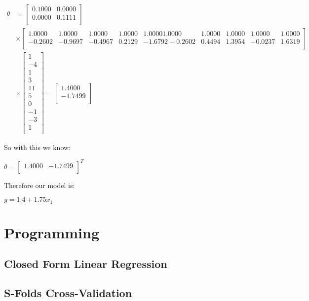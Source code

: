 \documentclass[12pt]{article}
\begin{document}
\begin{center}
\begin{align*}
        \theta &=
        \begin{bmatrix}
            0.1000 &  0.0000\\
            0.0000  &  0.1111\\
        \end{bmatrix} 
        \\
        &\times
        \begin{bmatrix}
            1.0000  &  1.0000 &   1.0000   & 1.0000  &  1.0000    1.0000  &  1.0000 &   1.0000   & 1.0000  &  1.0000 \\
            -0.2602 &   -0.9697  & -0.4967 &   0.2129 &  -1.6792   -0.2602  &  0.4494 &   1.3954  & -0.0237 &   1.6319 \\
        \end{bmatrix}
        \\
        &\times
        \begin{bmatrix}
            1\\
            -4\\
            1\\
            3\\
            11\\
            5\\
            0\\
            -1\\
            -3\\
            1\\
        \end{bmatrix}
        = 
        \begin{bmatrix}
            1.4000 \\
            - 1.7499 \\
        \end{bmatrix}
    \end{align*}
\end{center}

\noindent
So with this we know:
\begin{center}
    $
    \theta = 
    \begin{bmatrix}
    1.4000 & -1.7499 \\
    \end{bmatrix}
    ^{T}
    $
\end{center}

\noindent
Therefore our model is:

\begin{center}
    $
    y = 1.4 + 1.75x_{1}
    $
\end{center}
\newpage

\section{Programming}
\subsection{Closed Form Linear Regression}

\newpage
\subsection{S-Folds Cross-Validation}
\end{document}
